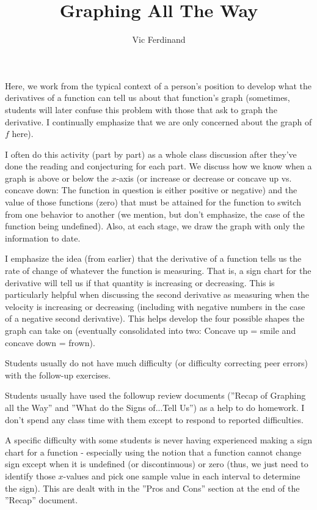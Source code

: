 \documentclass{ximera}
\author{Vic Ferdinand}
\title{Graphing All The Way}
\begin{document}
\begin{abstract}
\end{abstract}
\maketitle

\begin{instructorIntro}
Here, we work from the typical context of a person's position to develop what the derivatives of a function can tell us about that function's graph (sometimes, students will later confuse this problem with those that ask to graph the derivative.  I continually emphasize that we are only concerned about the graph of $f$ here).

I often do this activity (part by part) as a whole class discussion after they've done the reading and conjecturing for each part.  We discuss how we know when a graph is above or below the $x$-axis (or increase or decrease or concave up vs. concave down:  The function in question is either positive or negative) and the value of those functions (zero) that must be attained for the function to switch from one behavior to another (we mention, but don't emphasize, the case of the function being undefined).  Also, at each stage, we draw the graph with only the information to date.

I emphasize the idea (from earlier) that the derivative of a function tells us the rate of change of whatever the function is measuring.  That is, a sign chart for the derivative will tell us if that quantity is increasing or decreasing.  This is particularly helpful when discussing the second derivative as measuring when the velocity is increasing or decreasing (including with negative numbers in the case of a negative second derivative).  This helps develop the four possible shapes the graph can take on (eventually consolidated into two:  Concave up = smile and concave down = frown).

Students usually do not have much difficulty (or difficulty correcting peer errors) with the follow-up exercises.

Students usually have used the followup review documents (''Recap of Graphing all the Way'' and ''What do the Signs of...Tell Us'') as a help to do homework.  I don't spend any class time with them except to respond to reported difficulties.  

A specific difficulty with some students is never having experienced making a sign chart for a function - especially using the notion that a function cannot change sign except when it is undefined (or discontinuous) or zero (thus, we just need to identify those $x$-values and pick one sample value in each interval to determine the sign).  This are dealt with in the ''Pros and Cons'' section at the end of the ''Recap'' document.

\end{instructorIntro}
\end{document}
